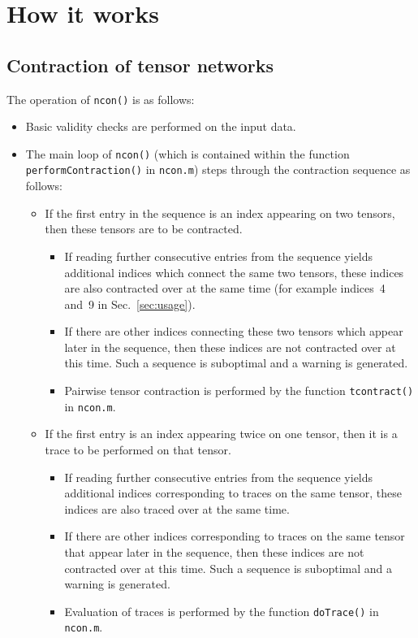 \documentclass[aps,prb,reprint,superscriptaddress,amsmath,amsfonts]{revtex4-1}
\theoremstyle{definition}
\newcommand{\sref}[1]{Sec.~\ref{#1}}
\newcommand{\ttt}[1]{\texttt{#1}}
\begin{document}
\section{How it works}

\subsection{Contraction of tensor networks}

The operation of \ttt{ncon()} is as follows:
\begin{itemize}
\item Basic validity checks are performed on the input data.
\item The main loop of \ttt{ncon()} (which is contained within the function \ttt{performContraction()} in \ttt{ncon.m}) steps through the contraction sequence as follows:
\begin{itemize}
\item If the first entry in the sequence is an index appearing on two tensors, then these tensors are to be contracted.
\begin{itemize}
\item If reading further consecutive entries from the sequence yields additional indices which connect the same two tensors, these indices are also contracted over at the same time (for example indices~4 and~9 in \sref{sec:usage}).
\item If there are other indices connecting these two tensors which appear later in the sequence, then these indices are not contracted over at this time. Such a sequence is suboptimal and a warning is generated. %
\item Pairwise tensor contraction is performed by the function \ttt{tcontract()} in \ttt{ncon.m}.
\end{itemize}
\item If the first entry is an index appearing twice on one tensor, then it is a trace to be performed on that tensor.
\begin{itemize}
\item If reading further consecutive entries from the sequence yields additional indices corresponding to traces on the same tensor, these indices are also traced over at the same time.
\item If there are other indices corresponding to traces on the same tensor that appear later in the sequence, then these indices are not contracted over at this time. Such a sequence is suboptimal and a warning is generated. %
\item Evaluation of traces is performed by the function \ttt{doTrace()} in \ttt{ncon.m}.

\end{itemize}
\end{itemize}
\end{itemize}
\end{document}
